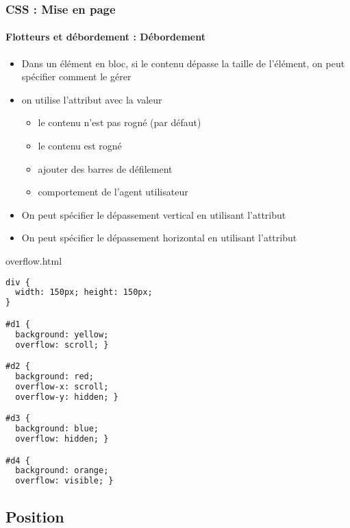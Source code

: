 \documentclass[xcolor=table]{beamer}
\begin{document}
\begin{frame}[fragile]
\frametitle{CSS : Mise en page}
\framesubtitle{Flotteurs et débordement : Débordement}

\begin{minipage}{0.60\textwidth}
	\begin{itemize}
		\item Dans un élément en bloc, si le contenu dépasse la taille de l'élément, on peut spécifier comment le gérer
		\item on utilise l'attribut  avec la valeur
		\begin{itemize}
			\item {} le contenu n'est pas rogné (par défaut)
			\item {} le contenu est rogné
			\item {} ajouter des barres de défilement
			\item {} comportement de l'agent utilisateur
		\end{itemize}
		\item On peut spécifier le dépassement vertical en utilisant l'attribut 
		\item On peut spécifier le dépassement horizontal en utilisant l'attribut 
	\end{itemize}
\end{minipage}
%
\begin{minipage}{0.38\textwidth}
	\begin{exampleblock}{overflow.html}
		\lstset{escapeinside=**}
		\tiny\bfseries
\begin{lstlisting}[language={html}]
div {
  width: 150px; height: 150px;
}

#d1 {
  background: yellow;
  overflow: scroll; }

#d2 {
  background: red;
  overflow-x: scroll;
  overflow-y: hidden; }

#d3 {
  background: blue;
  overflow: hidden; }

#d4 {
  background: orange;
  overflow: visible; }
\end{lstlisting}
	\end{exampleblock}
\end{minipage}
\end{frame}

\subsection{Position}
\end{document}
